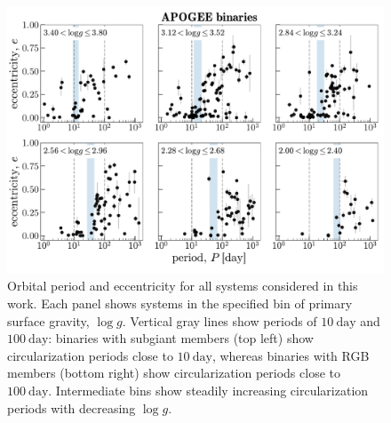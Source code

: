 \documentclass[modern, letterpaper]{aastex62}
\newcommand{\logg}{\ensuremath{\log g}}
\begin{document}
\begin{figure}[h]
\begin{center}
\includegraphics[width=\textwidth]{P-e-grid}
\end{center}
\caption{%
Orbital period and eccentricity for all systems considered in this work.
Each panel shows systems in the specified bin of primary surface gravity, \logg.
Vertical gray lines show periods of $10~\textrm{day}$ and $100~\textrm{day}$:
binaries with subgiant members (top left) show circularization periods close to
$10~\textrm{day}$, whereas binaries with RGB members (bottom right) show
circularization periods close to $100~\textrm{day}$.
Intermediate bins show steadily increasing circularization periods with
decreasing \logg.
\label{fig:P-e-grid}
}
\end{figure}
\end{document}
